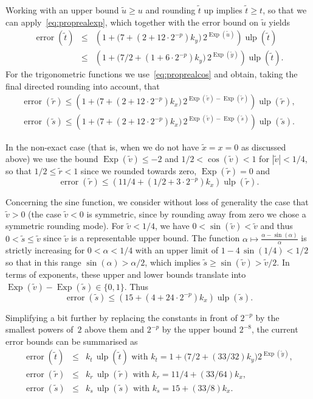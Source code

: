 \documentclass [11pt]{article}
\newcommand {\appro}[1]{\widetilde {#1}}
\newcommand {\Ulp}{{\operatorname {ulp}}}
\DeclareMathOperator{\Exp}{\operatorname {Exp}}
\newcommand{\error}{\operatorname {error}}
\renewcommand {\leq}{\leqslant}
\renewcommand {\geq}{\geqslant}
\begin{document}
Working with an upper bound $\appro u \geq u$ and rounding $\appro t$ up
implies $\appro t \geq t$, so that we can apply~\eqref {eq:proprealexp},
which together with the error bound on $\appro u$ yields
\begin {eqnarray*}
\error (\appro t)
& \leq &
\left( 1 +
\big( 7 + (2 + 12 \cdot 2^{-p}) k_y \big) \, 2^{\Exp (\appro u)}
\right) \Ulp (\appro t) \\
& \leq &
\left( 1 +
\big( 7/2 + (1 + 6 \cdot 2^{-p}) k_y \big) \, 2^{\Exp (\appro y)}
\right) \Ulp (\appro t).
\end {eqnarray*}
For the trigonometric functions we use~\eqref {eq:proprealcos} and obtain,
taking the final directed rounding into account, that
\begin {eqnarray*}
\error (\appro r) \leq
\left( 1 +
\big( 7 + (2 + 12 \cdot 2^{-p}) k_x \big) \,
2^{\Exp (\appro v) - \Exp (\appro r)}
\right) \Ulp (\appro r), \\
\error (\appro s) \leq
\left( 1 +
\big( 7 + (2 + 12 \cdot 2^{-p}) k_x \big) \,
2^{\Exp (\appro v) - \Exp (\appro s)}
\right) \Ulp (\appro s).
\end {eqnarray*}

In the non-exact case (that is, when we do not have $\appro x = x = 0$ as
discussed above) we use the bound $\Exp (\appro v) \leq -2$ and
$1/2 < \cos (\appro v) < 1$ for $|\appro v| < 1/4$, so that
$1/2 \leq \appro r < 1$ since we rounded towards zero,
$\Exp (\appro r) = 0$ and
\[
\error (\appro r) \leq
\left( 11/4 + (1/2 + 3 \cdot 2^{-p}) k_x \right) \Ulp (\appro r).
\]

Concerning the sine function, we consider without loss of generality the
case that $\appro v > 0$ (the case $\appro v < 0$ is symmetric, since by
rounding away from zero we chose a symmetric rounding mode).
For $\appro v < 1/4$, we have $0 < \sin (\appro v) < \appro v$ and thus
$0 < \appro s \leq \appro v$ since $\appro v$ is a representable upper bound.
The function $\alpha \mapsto \frac {\alpha - \sin (\alpha)}{\alpha}$
is strictly increasing for $0 < \alpha < 1/4$ with an upper limit of
$1 - 4 \, \sin (1/4) < 1/2$ so that in this range
$\sin (\alpha) > \alpha / 2$, which implies
$\appro s \geq \sin (\appro v) > \appro v / 2$.
In terms of exponents, these upper and lower bounds translate into
$\Exp (\appro v) - \Exp (\appro s) \in \{ 0, 1 \}$. Thus
\[
\error (\appro s) \leq
\left( 15 + (4 + 24 \cdot 2^{-p}) k_x \right) \Ulp (\appro s).
\]

Simplifying a bit further by replacing the constants in front of $2^{-p}$
by the smallest powers of~$2$ above them and $2^{-p}$ by the upper
bound $2^{-8}$, the current error bounds can be summarised as
\begin {eqnarray*}
\error (\appro t)
& \leq & k_t \, \Ulp (\appro t)
   \text { with } k_t =
   1 + \big( 7/2 + (33/32) k_y \big) 2^{\Exp (\appro y)}, \\
\error (\appro r)
& \leq & k_r \, \Ulp (\appro r)
   \text { with } k_r = 11/4 + (33/64) k_x, \\
\error (\appro s)
& \leq & k_s \, \Ulp (\appro s)
   \text { with } k_s = 15 + (33/8) k_x.
\end {eqnarray*}
\end{document}
